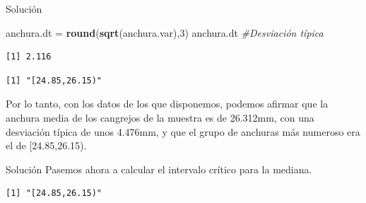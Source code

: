\documentclass[
  ignorenonframetext,
  aspectratio=169]{beamer}
\newenvironment{Shaded}{\begin{snugshade}}{\end{snugshade}}
\newcommand{\CommentTok}[1]{\textcolor[rgb]{0.56,0.35,0.01}{\textit{#1}}}
\newcommand{\DecValTok}[1]{\textcolor[rgb]{0.00,0.00,0.81}{#1}}
\newcommand{\FloatTok}[1]{\textcolor[rgb]{0.00,0.00,0.81}{#1}}
\newcommand{\FunctionTok}[1]{\textcolor[rgb]{0.13,0.29,0.53}{\textbf{#1}}}
\newcommand{\NormalTok}[1]{#1}
\newcommand{\OtherTok}[1]{\textcolor[rgb]{0.56,0.35,0.01}{#1}}
\newcommand{\SpecialCharTok}[1]{\textcolor[rgb]{0.81,0.36,0.00}{\textbf{#1}}}
\begin{document}
\begin{frame}[fragile]{Solución}
\label{soluciuxf3n-32}
\begin{Shaded}
\begin{Highlighting}[]
\NormalTok{anchura.dt }\OtherTok{=} \FunctionTok{round}\NormalTok{(}\FunctionTok{sqrt}\NormalTok{(anchura.var),}\DecValTok{3}\NormalTok{)}
\NormalTok{anchura.dt }\CommentTok{\#Desviación típica}
\end{Highlighting}
\end{Shaded}

\begin{verbatim}
[1] 2.116
\end{verbatim}

\begin{Shaded}
\end{Shaded}

\begin{verbatim}
[1] "[24.85,26.15)"
\end{verbatim}

Por lo tanto, con los datos de los que disponemos, podemos afirmar que
la anchura media de los cangrejos de la muestra es de 26.312mm, con una
desviación típica de unos 4.476mm, y que el grupo de anchuras más
numeroso era el de {[}24.85,26.15).
\end{frame}

\begin{frame}[fragile]{Solución}
\label{soluciuxf3n-33}
Pasemos ahora a calcular el intervalo crítico para la mediana.

\begin{Shaded}
\end{Shaded}

\begin{verbatim}
[1] "[24.85,26.15)"
\end{verbatim}
\end{frame}
\end{document}
